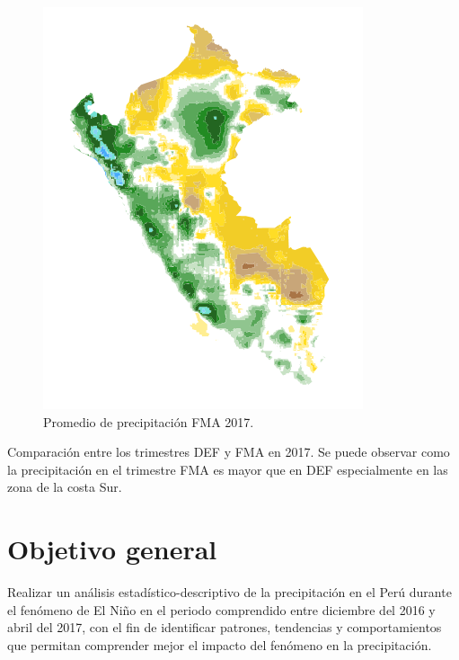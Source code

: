 \documentclass{article}
\begin{document}
\begin{figure}[h]
\begin{minipage}{0.45\textwidth}
      \includegraphics[width=\textwidth]{./assets/2017_abril.png}
      \caption{Promedio de precipitación FMA 2017.}
  \end{minipage}
  \label{fig:1}
\end{figure}
  Comparación entre los trimestres DEF y FMA en 2017. Se puede observar como la precipitación en el trimestre FMA es mayor que en DEF especialmente en las zona de la costa Sur.

\newpage

\section{Objetivo general}

Realizar un análisis estadístico-descriptivo de la precipitación en el Perú durante el fenómeno de El Niño en el periodo comprendido entre diciembre del 2016 y abril del 2017, con el fin de identificar patrones, tendencias y comportamientos que permitan comprender mejor el impacto del fenómeno en la precipitación.
\end{document}
